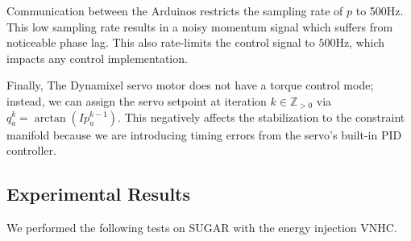 \documentclass[journal,twoside,web, onecolumn, draftcls]{ieeecolor}
\begin{document}
Communication between the Arduinos restricts the sampling rate of \(p\) to
500Hz.
This low sampling rate results in a noisy momentum signal which suffers
from noticeable phase lag.
This also rate-limits the control signal to \(500\)Hz, which impacts any control
implementation.

Finally, The Dynamixel servo motor does not have a torque control mode; instead,
we can assign the servo setpoint at iteration \(k \in \mathbb{Z}_{> 0}\)
via \(q_a^{k} = \arctan(I p_u^{k-1})\).
This negatively affects the stabilization to the constraint
manifold because we are introducing timing errors from the servo's built-in PID
controller.

\subsection{Experimental Results}

We performed the following tests on SUGAR with the energy injection VNHC.
\end{document}
